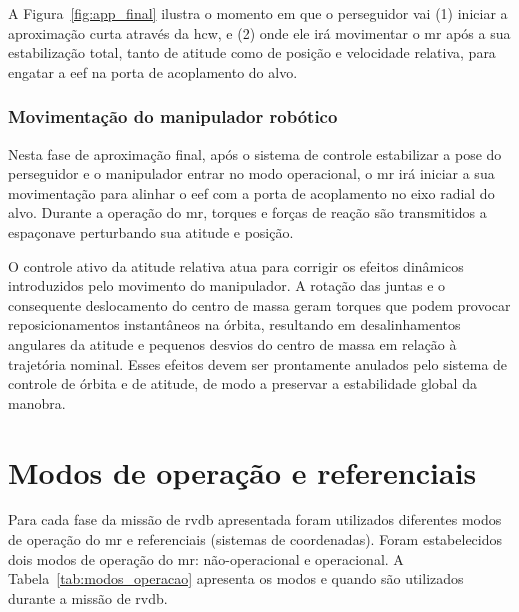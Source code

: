 A Figura~\ref{fig:app_final} ilustra o momento em que o perseguidor vai (1) iniciar a aproximação curta através da \gls{hcw}, e (2) onde ele irá movimentar o \gls{mr} após a sua estabilização total, tanto de atitude como de posição e velocidade relativa, para engatar a \gls{eef} na porta de acoplamento do alvo.


\subsubsection{Movimentação do manipulador robótico}

Nesta fase de aproximação final, após o sistema de controle estabilizar a pose do perseguidor e o manipulador entrar no modo operacional, o \gls{mr} irá iniciar a sua movimentação para alinhar o \gls{eef} com a porta de acoplamento no eixo radial do alvo.
Durante a operação do \gls{mr}, torques e forças de reação são transmitidos a espaçonave perturbando sua atitude e posição.

O controle ativo da atitude relativa atua para corrigir os efeitos dinâmicos introduzidos pelo movimento do manipulador. A rotação das juntas e o consequente deslocamento do centro de massa geram torques que podem provocar reposicionamentos instantâneos na órbita, resultando em desalinhamentos angulares da atitude e pequenos desvios do centro de massa em relação à trajetória nominal.
Esses efeitos devem ser prontamente anulados pelo sistema de controle de órbita e de atitude, de modo a preservar a estabilidade global da manobra.


\section{Modos de operação e referenciais}

Para cada fase da missão de \gls{rvdb} apresentada foram utilizados diferentes modos de operação do \gls{mr} e referenciais (sistemas de coordenadas).
Foram estabelecidos dois modos de operação do \gls{mr}: não-operacional e operacional.
A Tabela~\ref{tab:modos_operacao} apresenta os modos e quando são utilizados durante a missão de \gls{rvdb}.

